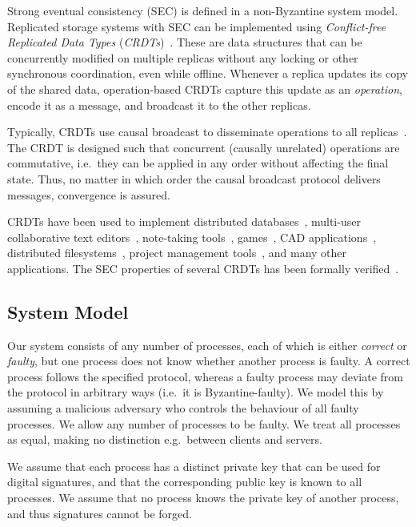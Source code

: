 \documentclass[a4paper,anonymous,USenglish]{lipics-v2019}
\begin{document}
Strong eventual consistency (SEC) is defined in a non-Byzantine system model.
Replicated storage systems with SEC can be implemented using \emph{Conflict-free Replicated Data Types} (\emph{CRDTs})~\cite{Shapiro:2011}.
These are data structures that can be concurrently modified on multiple replicas without any locking or other synchronous coordination, even while offline.
Whenever a replica updates its copy of the shared data, operation-based CRDTs capture this update as an \emph{operation}, encode it as a message, and broadcast it to the other replicas.

Typically, CRDTs use causal broadcast to disseminate operations to all replicas~\cite{Gomes:2017gy,Shapiro:2011}.
The CRDT is designed such that concurrent (causally unrelated) operations are commutative, i.e.\ they can be applied in any order without affecting the final state.
Thus, no matter in which order the causal broadcast protocol delivers messages, convergence is assured.

CRDTs have been used to implement distributed databases~\cite{Akkoorath2016Cure,Zawirski2015SwiftCloud}, multi-user collaborative text editors~\cite{Weiss:2009ht}, note-taking tools~\cite{vanHardenberg2020PushPin}, games~\cite{vanderLinde:2017fu}, CAD applications~\cite{Lv:2018ie}, distributed filesystems~\cite{Najafzadeh:2018bw,Tao:2015gd}, project management tools~\cite{Kleppmann2019localfirst}, and many other applications.
The SEC properties of several CRDTs has been formally verified~\cite{Gomes:2017gy,Zeller:2014fl}.

\subsection{System Model}\label{sec:system-model}

Our system consists of any number of processes, each of which is either \emph{correct} or \emph{faulty}, but one process does not know whether another process is faulty.
A correct process follows the specified protocol, whereas a faulty process may deviate from the protocol in arbitrary ways (i.e.\ it is Byzantine-faulty).
We model this by assuming a malicious adversary who controls the behaviour of all faulty processes.
We allow any number of processes to be faulty.
We treat all processes as equal, making no distinction e.g.\ between clients and servers.

We assume that each process has a distinct private key that can be used for digital signatures, and that the corresponding public key is known to all processes.
We assume that no process knows the private key of another process, and thus signatures cannot be forged.
\end{document}
